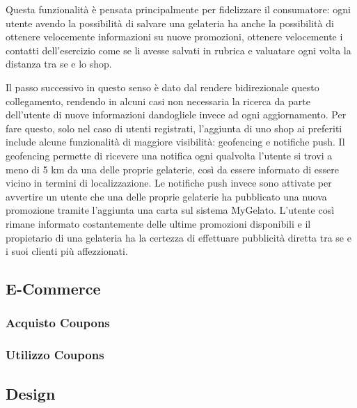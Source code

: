 Questa funzionalità è pensata principalmente per fidelizzare il consumatore: ogni utente avendo la possibilità di salvare una gelateria ha anche la possibilità di ottenere velocemente informazioni su nuove promozioni, ottenere velocemente i contatti dell'esercizio come se li avesse salvati in rubrica e valuatare ogni volta la distanza tra se e lo shop.

Il passo successivo in questo senso è dato dal rendere bidirezionale questo collegamento, rendendo in alcuni casi non necessaria la ricerca da parte dell'utente di nuove informazioni dandogliele invece ad ogni aggiornamento.
Per fare questo, solo nel caso di utenti registrati, l'aggiunta di uno shop ai preferiti include alcune funzionalità di maggiore visibilità: geofencing e notifiche push.
Il geofencing permette di ricevere una notifica ogni qualvolta l'utente si trovi a meno di 5 km da una delle proprie gelaterie, così da essere informato di essere vicino in termini di localizzazione.
Le notifiche push invece sono attivate per avvertire un utente che una delle proprie gelaterie ha pubblicato una nuova promozione tramite l'aggiunta una carta sul sistema MyGelato.
L'utente così rimane informato costantemente delle ultime promozioni disponibili e il propietario di una gelateria ha la certezza di effettuare pubblicità diretta tra se e i suoi clienti più affezzionati.


\subsection{E-Commerce}

\subsubsection{Acquisto Coupons}

\subsubsection{Utilizzo Coupons}

\subsection{Design}

\newpage